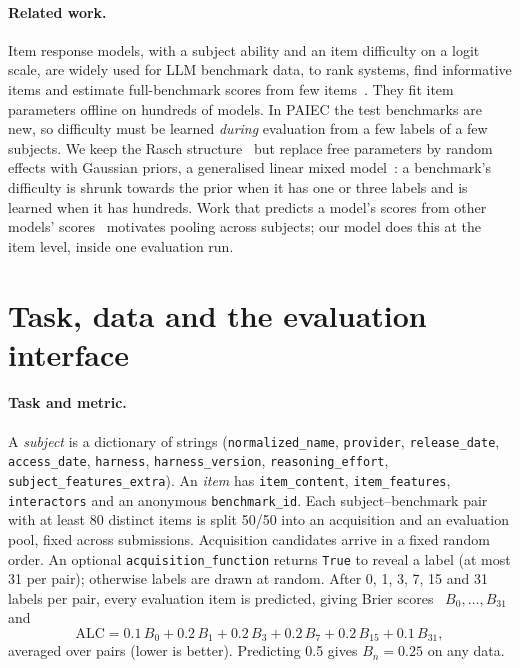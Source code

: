 \documentclass{article}
\begin{document}
\paragraph{Related work.} Item response models, with a subject ability and an item difficulty on a logit scale, are widely used for LLM benchmark data, to rank systems, find informative items and estimate full-benchmark scores from few items~\citep{rodriguez2021evaluation,polo2024tinybenchmarks,kipnis2025metabench}. They fit item parameters offline on hundreds of models. In PAIEC the test benchmarks are new, so difficulty must be learned \emph{during} evaluation from a few labels of a few subjects. We keep the Rasch structure~\citep{lord1980} but replace free parameters by random effects with Gaussian priors, a generalised linear mixed model~\citep{breslow1993}: a benchmark's difficulty is shrunk towards the prior when it has one or three labels and is learned when it has hundreds. Work that predicts a model's scores from other models' scores~\citep{ruan2024observational,ye2023predictable} motivates pooling across subjects; our model does this at the item level, inside one evaluation run.

\section{Task, data and the evaluation interface}
\label{sec:task}

\paragraph{Task and metric.} A \emph{subject} is a dictionary of strings (\texttt{normalized\_name}, \texttt{provider}, \texttt{release\_date}, \texttt{access\_date}, \texttt{harness}, \texttt{harness\_version}, \texttt{reasoning\_effort}, \texttt{subject\_features\_extra}). An \emph{item} has \texttt{item\_content}, \texttt{item\_features}, \texttt{interactors} and an anonymous \texttt{benchmark\_id}. Each subject--benchmark pair with at least 80 distinct items is split 50/50 into an acquisition and an evaluation pool, fixed across submissions. Acquisition candidates arrive in a fixed random order. An optional \texttt{acquisition\_function} returns \texttt{True} to reveal a label (at most 31 per pair); otherwise labels are drawn at random. After 0, 1, 3, 7, 15 and 31 labels per pair, every evaluation item is predicted, giving Brier scores~\citep{brier1950} $B_0,\dots,B_{31}$ and
\begin{equation}
\mathrm{ALC} = 0.1\,B_0 + 0.2\,B_1 + 0.2\,B_3 + 0.2\,B_7 + 0.2\,B_{15} + 0.1\,B_{31},
\label{eq:alc}
\end{equation}
averaged over pairs (lower is better). Predicting 0.5 gives $B_n=0.25$ on any data.
\end{document}

